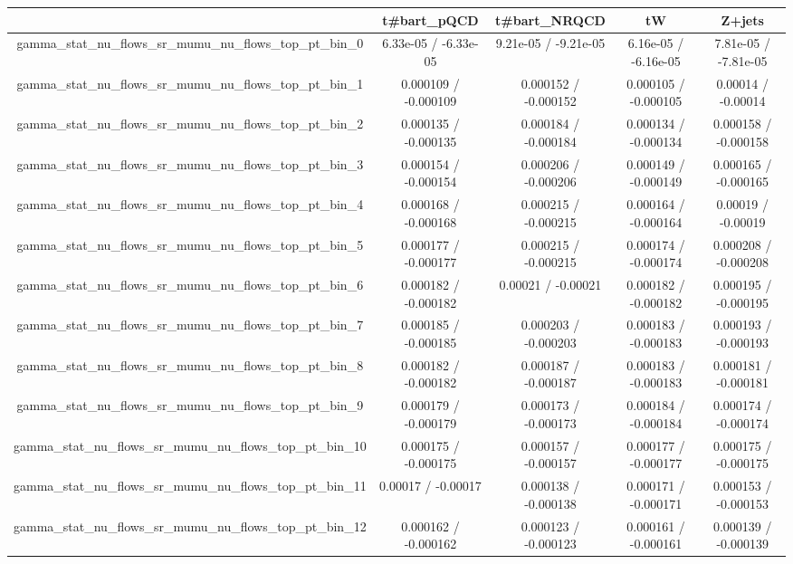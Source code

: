 \documentclass[10pt]{article}
\begin{document}
\begin{table}[htbp]
\begin{center}
\begin{tabular}{|c|c|c|c|c|}
\hline 
      & t#bar{t}_{pQCD}      & t#bar{t}_{NRQCD}      & tW      & Z+jets \\ 
\hline 
  gamma_stat_nu_flows_sr_mumu_nu_flows_top_pt_bin_0 & 6.33e-05 / -6.33e-05 & 9.21e-05 / -9.21e-05 & 6.16e-05 / -6.16e-05 & 7.81e-05 / -7.81e-05 \\ 
  gamma_stat_nu_flows_sr_mumu_nu_flows_top_pt_bin_1 & 0.000109 / -0.000109 & 0.000152 / -0.000152 & 0.000105 / -0.000105 & 0.00014 / -0.00014 \\ 
  gamma_stat_nu_flows_sr_mumu_nu_flows_top_pt_bin_2 & 0.000135 / -0.000135 & 0.000184 / -0.000184 & 0.000134 / -0.000134 & 0.000158 / -0.000158 \\ 
  gamma_stat_nu_flows_sr_mumu_nu_flows_top_pt_bin_3 & 0.000154 / -0.000154 & 0.000206 / -0.000206 & 0.000149 / -0.000149 & 0.000165 / -0.000165 \\ 
  gamma_stat_nu_flows_sr_mumu_nu_flows_top_pt_bin_4 & 0.000168 / -0.000168 & 0.000215 / -0.000215 & 0.000164 / -0.000164 & 0.00019 / -0.00019 \\ 
  gamma_stat_nu_flows_sr_mumu_nu_flows_top_pt_bin_5 & 0.000177 / -0.000177 & 0.000215 / -0.000215 & 0.000174 / -0.000174 & 0.000208 / -0.000208 \\ 
  gamma_stat_nu_flows_sr_mumu_nu_flows_top_pt_bin_6 & 0.000182 / -0.000182 & 0.00021 / -0.00021 & 0.000182 / -0.000182 & 0.000195 / -0.000195 \\ 
  gamma_stat_nu_flows_sr_mumu_nu_flows_top_pt_bin_7 & 0.000185 / -0.000185 & 0.000203 / -0.000203 & 0.000183 / -0.000183 & 0.000193 / -0.000193 \\ 
  gamma_stat_nu_flows_sr_mumu_nu_flows_top_pt_bin_8 & 0.000182 / -0.000182 & 0.000187 / -0.000187 & 0.000183 / -0.000183 & 0.000181 / -0.000181 \\ 
  gamma_stat_nu_flows_sr_mumu_nu_flows_top_pt_bin_9 & 0.000179 / -0.000179 & 0.000173 / -0.000173 & 0.000184 / -0.000184 & 0.000174 / -0.000174 \\ 
  gamma_stat_nu_flows_sr_mumu_nu_flows_top_pt_bin_10 & 0.000175 / -0.000175 & 0.000157 / -0.000157 & 0.000177 / -0.000177 & 0.000175 / -0.000175 \\ 
  gamma_stat_nu_flows_sr_mumu_nu_flows_top_pt_bin_11 & 0.00017 / -0.00017 & 0.000138 / -0.000138 & 0.000171 / -0.000171 & 0.000153 / -0.000153 \\ 
  gamma_stat_nu_flows_sr_mumu_nu_flows_top_pt_bin_12 & 0.000162 / -0.000162 & 0.000123 / -0.000123 & 0.000161 / -0.000161 & 0.000139 / -0.000139 \\ 

\end{tabular}
\end{center}
\end{table}
\end{document}
